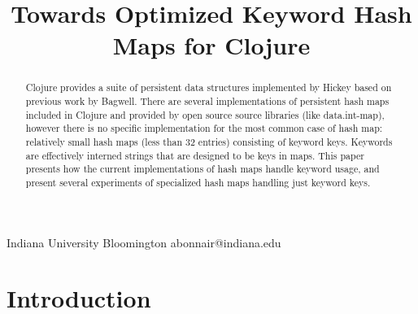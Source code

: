\documentclass[preprint]{sigplanconf}
\begin{document}
\setlength{\pdfpageheight}{\paperheight}
\setlength{\pdfpagewidth}{\paperwidth}

%

           { Indiana University Bloomington }
           { abonnair@indiana.edu}


\title{Towards Optimized Keyword Hash Maps for Clojure}

\maketitle

\begin{abstract}
Clojure provides a suite of persistent data structures
implemented by Hickey based on previous work by Bagwell.
There are several implementations of persistent hash maps
included in Clojure and provided by open source source libraries
(like data.int-map), however there is no specific
implementation for the most common case of hash map:
relatively small hash maps (less than 32 entries)
consisting of keyword keys.
Keywords are effectively interned strings that are designed
to be keys in maps.
This paper presents how the current implementations
of hash maps handle keyword usage, 
and present several experiments of specialized hash maps
handling just keyword keys.

\end{abstract}


\section{Introduction}
\end{document}
